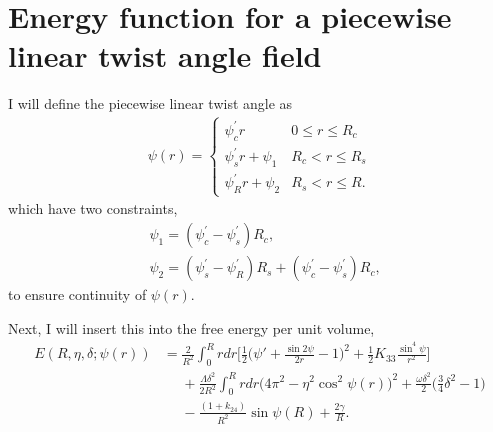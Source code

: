 \documentclass[12pt]{article}
\begin{document}


\section{Energy function for a piecewise linear twist angle field}
I will define the piecewise linear twist angle as
\begin{align}\label{eq:basicpiecewise}
\psi(r)=
\begin{cases}
	\psi_c^{\prime} r					& 0 \leq r \leq R_c \\
	\psi_s^{\prime} r +\psi_1			& R_c < r \leq R_s \\
	\psi_R^{\prime}r+\psi_2				& R_s < r \leq R.
\end{cases}
\end{align}
which have two constraints,
\begin{subequations}
\begin{align}
&\psi_1=(\psi_c^{\prime}-\psi_s^{\prime})R_c\label{eq:psi1},\\
&\psi_2=(\psi_s^{\prime}-\psi_R^{\prime})R_s+(\psi_c^{\prime}-\psi_s^{\prime})R_c\label{eq:psi2},
\end{align}
\end{subequations}
to ensure continuity of $\psi(r)$.

Next, I will insert this into the free energy per unit volume,
\begin{align}\label{eq:startE}
E(R,\eta,\delta;\psi(r))&=\frac{2}{R^2}\int_0^{R}rdr\bigg[\frac{1}{2}\bigg(\psi'+\frac{\sin2\psi}{2r}-1\bigg)^2+\frac{1}{2}K_{33}\frac{\sin^4\psi}{r^2}\bigg]\nonumber\\
&\phantom{=}+\frac{\Lambda\delta^2}{2R^2}\int_0^{R}rdr\big(4\pi^2-\eta^2\cos^2\psi(r)\big)^2+\frac{\omega\delta^2}{2}\bigg(\frac{3}{4}\delta^2-1\bigg)\nonumber\\
&\phantom{=}-\frac{(1+k_{24})}{R^2}\sin\psi(R)+\frac{2\gamma}{R}.
\end{align}
\end{document}
